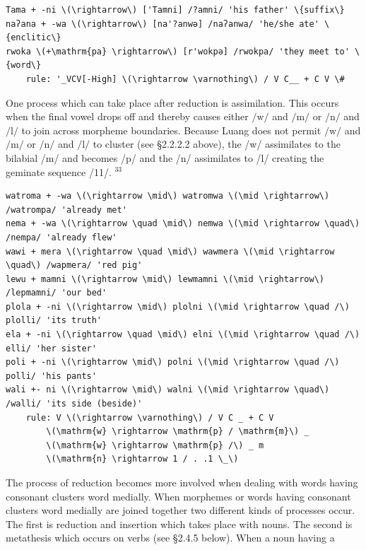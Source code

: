 \documentclass[10pt]{article}
\begin{document}
\begin{verbatim}
Tama + -ni \(\rightarrow\) ['Tamni] /?amni/ 'his father' \{suffix\}
naʔana + -wa \(\rightarrow\) [na'?anwə] /naʔanwa/ 'he/she ate' \{enclitic\}
rwoka \(+\mathrm{pa} \rightarrow\) [r'wokpә] /rwokpa/ 'they meet to' \{word\}
    rule: '_VCV[-High] \(\rightarrow \varnothing\) / V C__ + C V \#
\end{verbatim}

One process which can take place after reduction is assimilation. This occurs when the final vowel drops off and thereby causes either \(/ \mathrm{w} /\) and \(/ \mathrm{m} /\) or \(/ \mathrm{n} /\) and \(/ \mathrm{l} /\) to join across morpheme boundaries. Because Luang does not permit \(/ \mathrm{w} /\) and \(/ \mathrm{m} /\) or \(/ \mathrm{n} /\) and \(/ \mathrm{l} /\) to cluster (see §2.2.2.2 above), the /w/ assimilates to the bilabial /m/ and becomes /p/ and the /n/ assimilates to /l/ creating the geminate sequence /11/. \({ }^{33}\)

\begin{verbatim}
watroma + -wa \(\rightarrow \mid\) watromwa \(\mid \rightarrow\) /watrompa/ 'already met'
nema + -wa \(\rightarrow \quad \mid\) nemwa \(\mid \rightarrow \quad\) /nempa/ 'already flew'
wawi + mera \(\rightarrow \quad \mid\) wawmera \(\mid \rightarrow \quad\) /wapmera/ 'red pig'
lewu + mamni \(\rightarrow \mid\) lewmamni \(\mid \rightarrow\) /lepmamni/ 'our bed'
plola + -ni \(\rightarrow \mid\) plolni \(\mid \rightarrow \quad /\) plolli/ 'its truth'
ela + -ni \(\rightarrow \quad \mid\) elni \(\mid \rightarrow \quad /\) elli/ 'her sister'
poli + -ni \(\rightarrow \mid\) polni \(\mid \rightarrow \quad /\) polli/ 'his pants'
wali +- ni \(\rightarrow \mid\) walni \(\mid \rightarrow \quad\) /walli/ 'its side (beside)'
    rule: V \(\rightarrow \varnothing\) / V C _ + C V
        \(\mathrm{w} \rightarrow \mathrm{p} / \mathrm{m}\) _
        \(\mathrm{w} \rightarrow \mathrm{p} /\) _ m
        \(\mathrm{n} \rightarrow 1 / . .1 \_\)
\end{verbatim}

The process of reduction becomes more involved when dealing with words having consonant clusters word medially. When morphemes or words having consonant clusters word medially are joined together two different kinds of processes occur. The first is reduction and insertion which takes place with nouns. The second is metathesis which occurs on verbs (see §2.4.5 below). When a noun having a
\end{document}
